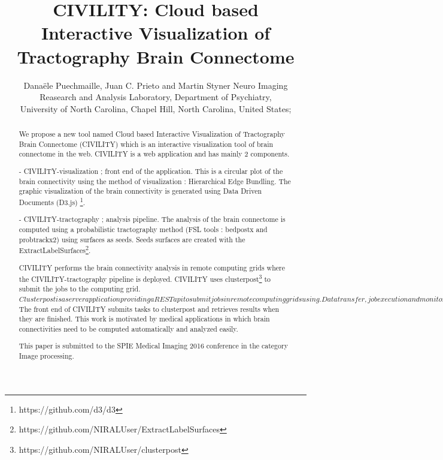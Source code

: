 \documentclass[]{spie}  %
\title{CIVILITY: Cloud based Interactive Visualization of Tractography Brain Connectome}
\author{Dana\"{e}le Puechmaille\supit{a}, Juan C. Prieto\supit{a} and Martin Styner\supit{a}
\skiplinehalf
\supit{a}Neuro Imaging Reasearch and Analysis Laboratory, Department of Psychiatry, \\
 University of North Carolina, Chapel Hill, North Carolina, United States;
}
\begin{document}
 
  \maketitle 

\begin{abstract}

We propose a new tool named Cloud based Interactive Visualization of Tractography Brain Connectome (CIVILITY) which is an interactive visualization tool of brain connectome in the web.
CIVILITY is a web application and has mainly 2 components.

- CIVILITY-visualization ; front end of the application. This is a circular plot of the brain connectivity using the method of visualization : Hierarchical Edge Bundling. The graphic visualization of the brain connectivity is generated using Data Driven Documents (D3.js) \footnote{https://github.com/d3/d3}.

- CIVILITY-tractography ; analysis pipeline. The analysis of the brain connectome is computed using a probabilistic tractography method (FSL tools : bedpostx and probtrackx2) using surfaces as seeds. Seeds surfaces are created with the ExtractLabelSurfaces\footnote{https://github.com/NIRALUser/ExtractLabelSurfaces}.

CIVILITY performs the brain connectivity analysis in remote computing grids where the CIVILITY-tractography pipeline is deployed. CIVILITY uses clusterpost\footnote{https://github.com/NIRALUser/clusterpost} to submit the jobs to the computing grid. $Clusterpost is a server application providing a REST api to submit jobs in remote computing grids using. Data transfer, job execution and monitoring are all handled by clusterpost.$
The front end of CIVILITY submits tasks to clusterpost and retrieves results when they are finished.
This work is motivated by medical applications in which brain connectivities need to be computed automatically and analyzed easily.

This paper is submitted to the SPIE Medical Imaging 2016 conference in the category Image processing. 

\end{abstract}



\end{document}
